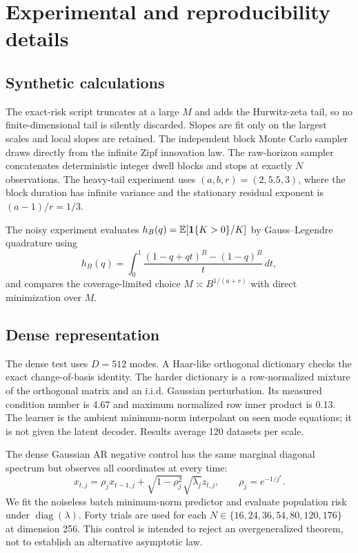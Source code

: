 \section{Experimental and reproducibility details}

\subsection{Synthetic calculations}
The exact-risk script truncates at a large $M$ and adds the Hurwitz-zeta tail,
so no finite-dimensional tail is silently discarded. Slopes are fit only on
the largest scales and local slopes are retained. The independent block Monte
Carlo sampler draws directly from the infinite Zipf innovation law. The
raw-horizon sampler concatenates deterministic integer dwell blocks and stops
at exactly $N$ observations. The heavy-tail experiment uses
$(a,b,r)=(2,5.5,3)$, where the block duration has infinite variance and the
stationary residual exponent is $(a-1)/r=1/3$.

The noisy experiment evaluates
$h_B(q)=\mathbb{E}[\mathbf{1}\{K>0\}/K]$ by Gauss--Legendre quadrature using
\[
h_B(q)=\int_0^1\frac{(1-q+qt)^B-(1-q)^B}{t}\,dt,
\]
and compares the coverage-limited choice $M\asymp B^{1/(a+r)}$ with direct
minimization over $M$.

\subsection{Dense representation}
The dense test uses $D=512$ modes. A Haar-like orthogonal dictionary checks the
exact change-of-basis identity. The harder dictionary is a row-normalized
mixture of the orthogonal matrix and an i.i.d. Gaussian perturbation. Its
measured condition number is 4.67 and maximum normalized row inner product is
0.13. The learner is the ambient minimum-norm interpolant on seen mode
equations; it is not given the latent decoder. Results average 120 datasets per
scale.

The dense Gaussian AR negative control has the same marginal diagonal spectrum
but observes all coordinates at every time:
\[
x_{t,j}=\rho_jx_{t-1,j}
+\sqrt{1-\rho_j^2}\sqrt{\lambda_j}z_{t,j},
\qquad \rho_j=e^{-1/j^r}.
\]
We fit the noiseless batch minimum-norm predictor and evaluate population risk
under $\operatorname{diag}(\lambda)$. Forty trials are used for each
$N\in\{16,24,36,54,80,120,176\}$ at dimension 256. This control is intended
to reject an overgeneralized theorem, not to establish an alternative
asymptotic law.

